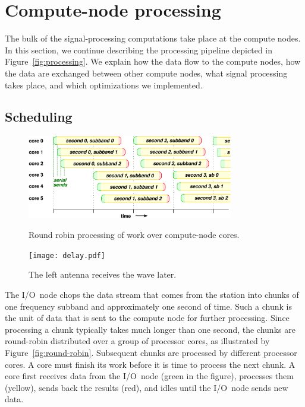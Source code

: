 \documentclass[10pt]{article}
\begin{document}



\section{Compute-node processing}

The bulk of the signal-processing computations take place at the compute nodes.
In this section, we continue describing the processing pipeline depicted in
Figure~\ref{fig:processing}.
We explain how the data flow to the compute nodes, how the data are exchanged
between other compute nodes, what signal processing takes place, and which
optimizations we implemented.


\subsection{Scheduling}

\begin{figure}
\begin{minipage}[b]{9cm}
\includegraphics[width=9cm]{round-robin.pdf}
\caption{Round robin processing of work over compute-node cores.}
\label{fig:round-robin}
\end{minipage}
\hfill
\begin{minipage}[b]{5cm}
\texttt{[image: delay.pdf]}
\caption{The left antenna receives the wave later.}
\label{fig:delay}
\end{minipage}
\end{figure}

The I/O~node chops the data stream that comes from the station into chunks of
one frequency subband and approximately one second of time.
Such a chunk is the unit of data that is sent to the compute node for further
processing.
Since processing a chunk typically takes much longer than one second,
the chunks are round-robin distributed over a group of processor cores,
as illustrated by Figure~\ref{fig:round-robin}.
Subsequent chunks are processed by different processor cores.
A core must finish its work before it is time to process the next chunk.
A core first receives data from the I/O~node (green in the figure),
processes them (yellow), sends back the results (red), and idles until the
I/O~node sends new data.
\end{document}

